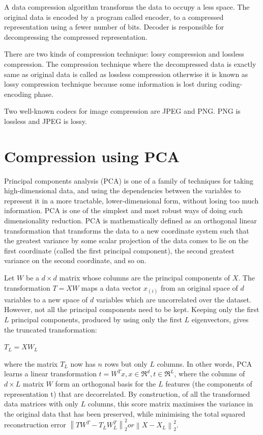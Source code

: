 A data compression algorithm transforms the data to occupy a less space.
The original data is encoded by a program called encoder, to a compressed  representation using a fewer number of bits.
Decoder is responsible for decompressing the compressed representation.

There are two kinds of compression technique: lossy compression and lossless compression. 
The compression technique where the decompressed data is exactly same as original data is called as lossless compression otherwise it is known as lossy compression technique because some information is lost during coding-encoding phase.

Two well-known codecs for image compression are JPEG and PNG. PNG is lossless and JPEG is lossy.

\section{Compression using PCA}

Principal components analysis (PCA) is one of a family of techniques for taking high-dimensional data, and using the dependencies between the variables to represent it in a more tractable, lower-dimensional form, without losing too much information. 
PCA is one of the simplest and most robust ways of doing such dimensionality reduction.
PCA is mathematically defined as an orthogonal linear transformation that transforms the data to a new coordinate system such that the greatest variance by some scalar projection of the data comes to lie on the first coordinate (called the first principal component), the second greatest variance on the second coordinate, and so on.


Let $W$ be a $d \times d$ matrix whose columns are the principal components of $X$. The transformation $T = X W$ maps a data vector $x_{(i)}$ from an original space of $d$ variables to a new space of $d$ variables which are uncorrelated over the dataset. However, not all the principal components need to be kept. Keeping only the first $L$ principal components, produced by using only the first $L$ eigenvectors, gives the truncated transformation:

$T_L = XW_L$


where the matrix $T_L$ now has $n$ rows but only $L$ columns. In other words, PCA learns a linear transformation 
$t = W^{T}x, x \in \Re^{d}, t \in \Re^{L}$, where the columns of $d \times L$ matrix $W$ form an orthogonal basis for the $L$ features (the components of representation t) that are decorrelated. By construction, of all the transformed data matrices with only $L$ columns, this score matrix maximises the variance in the original data that has been preserved, while minimising the total squared reconstruction error $\left \| TW^T - T_LW_L^T\right \|_2^2 or \left \| X - X_L \right \|_2^2$.

